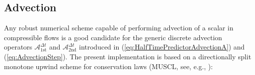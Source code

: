 \documentclass[12pt,a4paper]{article}
\theoremstyle{definition}
\newcommand{\eq}[1]{(\ref{#1})}
\newcommand{\dt}{\Delta t}
\begin{document}

\subsection{Advection}
\label{ssec:Advection}

Any robust numerical scheme capable of performing advection of a scalar in
compressible flows is a good candidate for the generic discrete
advection operators $\mathcal{A}_{\text{1st}}^{\dt}$ and 
$\mathcal{A}_{\text{2nd}}^{\dt}$ introduced in \eq{eq:HalfTimePredictorAdvectionA}
and \eq{eq:AdvectionStep}. 
The present implementation is based on a directionally split 
monotone upwind scheme for conservation laws (MUSCL, see, e.g.,
\cite{vanLeer2006}): 
\end{document}
